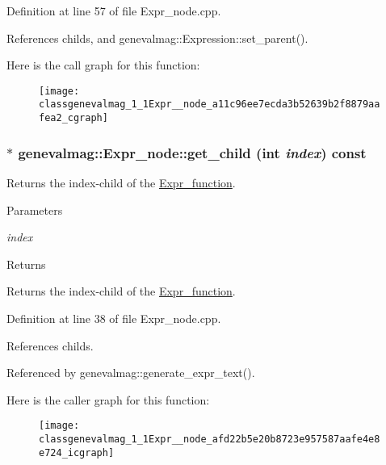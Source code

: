 Definition at line 57 of file Expr\_\-node.cpp.



References childs, and genevalmag::Expression::set\_\-parent().



Here is the call graph for this function:\nopagebreak
\begin{figure}[H]
\begin{center}
\leavevmode
\texttt{[image: classgenevalmag\_1\_1Expr\_\_node\_a11c96ee7ecda3b52639b2f8879aafea2\_cgraph]}
\end{center}
\end{figure}


\hypertarget{classgenevalmag_1_1Expr__node_afd22b5e20b8723e957587aafe4e8e724}{
\subsubsection[{get\_\-child}]{ $\ast$ genevalmag::Expr\_\-node::get\_\-child (int {\em index}) const}}
\label{classgenevalmag_1_1Expr__node_afd22b5e20b8723e957587aafe4e8e724}
Returns the index-\/child of the \hyperlink{classgenevalmag_1_1Expr__function}{Expr\_\-function}. 
\begin{DoxyParams}{Parameters}
\item[{\em index}]\end{DoxyParams}
\begin{DoxyReturn}{Returns}

\end{DoxyReturn}
Returns the index-\/child of the \hyperlink{classgenevalmag_1_1Expr__function}{Expr\_\-function}. 

Definition at line 38 of file Expr\_\-node.cpp.



References childs.



Referenced by genevalmag::generate\_\-expr\_\-text().



Here is the caller graph for this function:\nopagebreak
\begin{figure}[H]
\begin{center}
\leavevmode
\texttt{[image: classgenevalmag\_1\_1Expr\_\_node\_afd22b5e20b8723e957587aafe4e8e724\_icgraph]}
\end{center}
\end{figure}


